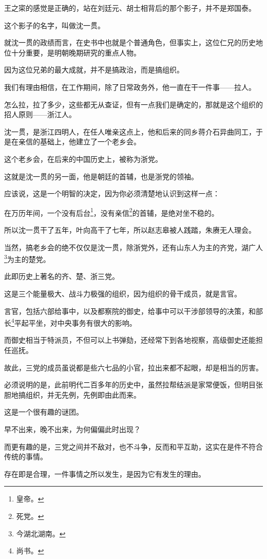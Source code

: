 \begin{multicols}{\theparacolNo}
王之寀的感觉是正确的，站在刘廷元、胡士相背后的那个影子，并不是郑国泰。

这个影子的名字，叫做沈一贯。

就沈一贯的政绩而言，在史书中也就是个普通角色，但事实上，这位仁兄的历史地位十分重要，是明朝晚期研究的重点人物。

因为这位兄弟的最大成就，并不是搞政治，而是搞组织。

我们有理由相信，在工作期间，除了日常政务外，他一直在干一件事——拉人。

怎么拉，拉了多少，这些都无从查证，但有一点我们是确定的，那就是这个组织的招人原则——浙江人。

沈一贯，是浙江四明人，在任人唯亲这点上，他和后来的同乡蒋介石异曲同工，于是在亲信的基础上，他建立了一个老乡会。

这个老乡会，在后来的中国历史上，被称为浙党。

这就是沈一贯的另一面，他是朝廷的首辅，也是浙党的领袖。

应该说，这是一个明智的决定，因为你必须清楚地认识到这样一点：

在万历年间，一个没有后台\footnote{皇帝。}，没有亲信\footnote{死党。}的首辅，是绝对坐不稳的。

所以沈一贯干了五年，叶向高干了七年，所以赵志皋被人践踏，朱赓无人理会。

当然，搞老乡会的绝不仅仅是沈一贯，除浙党外，还有山东人为主的齐党，湖广人\footnote{今湖北湖南。}为主的楚党。

此即历史上著名的齐、楚、浙三党。

这是三个能量极大、战斗力极强的组织，因为组织的骨干成员，就是言官。

言官，包括六部给事中，以及都察院的御史，给事中可以干涉部领导的决策，和部长\footnote{尚书。}平起平坐，对中央事务有很大的影响。

而御史相当于特派员，不但可以上书弹劾，还经常下到各地视察，高级御史还能担任巡抚。

故此，三党的成员虽说都是些六七品的小官，拉出来都不起眼，却是相当的厉害。

必须说明的是，此前明代二百多年的历史中，虽然拉帮结派是家常便饭，但明目张胆地搞组织，并无先例，先例即由此而来。

这是一个很有趣的谜团。

早不出来，晚不出来，为何偏偏此时出现？

而更有趣的是，三党之间并不敌对，也不斗争，反而和平互助，这实在是件不符合传统的事情。

存在即是合理，一件事情之所以发生，是因为它有发生的理由。


\end{multicols}
